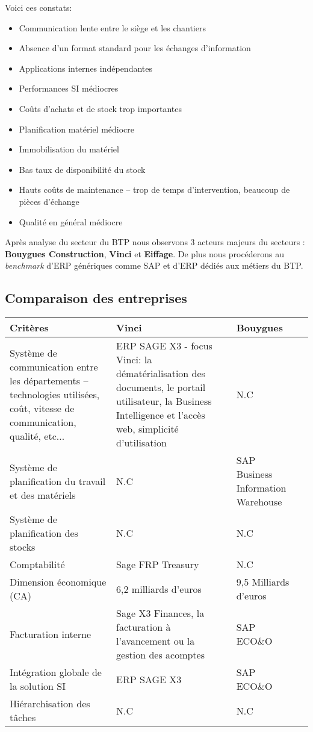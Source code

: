 \documentclass[twoside]{article}
\begin{document}
Voici ces constats:
\begin{itemize}
\item Communication lente entre le siège et les chantiers
\item Absence d'un format standard pour les échanges d'information
\item Applications internes indépendantes
\item Performances SI médiocres
\item Coûts d'achats et de stock trop importantes
\item Planification matériel médiocre
\item Immobilisation du matériel
\item Bas taux de disponibilité du stock
\item Hauts coûts de maintenance – trop de temps d'intervention,
beaucoup de pièces d'échange
\item Qualité en général médiocre
\end{itemize}

Après analyse du secteur du BTP nous observons 3 acteurs majeurs du secteurs :
{\bf Bouygues Construction}, {\bf Vinci} et {\bf Eiffage}. De plus nous procéderons 
au {\sl benchmark} d'ERP génériques comme SAP et d'ERP dédiés aux métiers du BTP.
\vfil
\pagebreak


\subsection{Comparaison des entreprises}

\begin{longtable}{|m{3cm}|m{4cm}|m{4cm}|m{4cm}|}
\hline
Critères&
Vinci&Bouygues\\
\endhead
\hline
Système de communication entre les départements – technologies utilisées, 
coût, vitesse de communication, qualité, etc...
&
ERP SAGE X3 - focus Vinci: la dématérialisation des documents,
le portail utilisateur, la Business Intelligence et l’accès web,
simplicité d’utilisation
&
N.C
\\
\hline
Système de planification du travail et des matériels 
&
N.C
&
SAP Business Information Warehouse
\\
\hline
Système de planification des stocks
&
N.C
&
N.C
\\
\hline
Comptabilité
&
Sage FRP Treasury
&
N.C
\\
\hline
Dimension économique (CA)
&
6,2 milliards d’euros
&
9,5 Milliards d'euros
\\
\hline
Facturation interne
&
Sage X3 Finances, la facturation à l’avancement ou la gestion des acomptes
&
SAP ECO\&O
\\
\hline
Intégration globale de la solution SI
&
ERP SAGE X3
&
SAP ECO\&O
\\
\hline
Hiérarchisation des tâches
&
N.C
&
N.C
\\\hline
\end{longtable}
\end{document}
